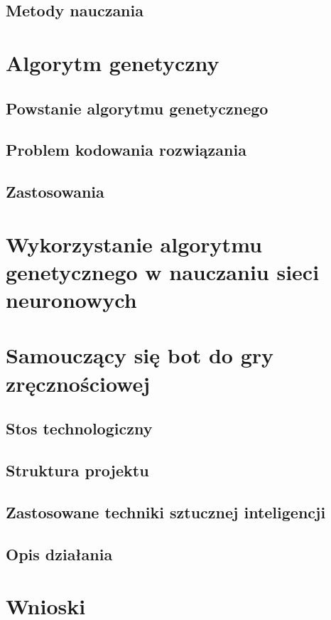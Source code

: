 \documentclass[12pt, oneside]{report}
\begin{document}
\section{Metody nauczania}

\chapter{Algorytm genetyczny}
\section{Powstanie algorytmu genetycznego}
\section{Problem kodowania rozwiązania}
\section{Zastosowania}

\chapter{Wykorzystanie algorytmu genetycznego w nauczaniu sieci neuronowych}

\chapter{Samouczący się bot do gry zręcznościowej}
\section{Stos technologiczny}
\section{Struktura projektu}
\section{Zastosowane techniki sztucznej inteligencji}
\section{Opis działania}

\chapter{Wnioski}
\end{document}
